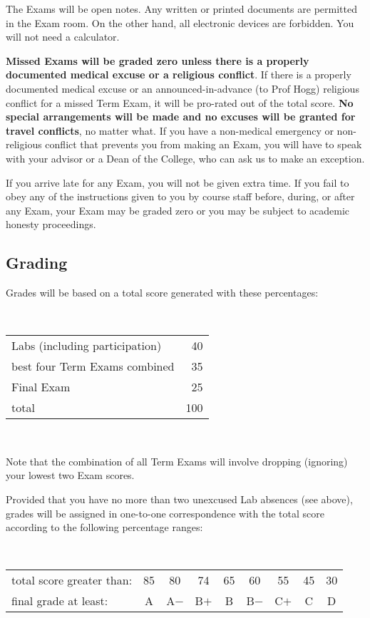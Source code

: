 \documentclass[12pt, letterpaper]{article}
\begin{document}
The Exams will be open notes.
Any written or printed documents are permitted in the Exam room.
On the other hand, all electronic devices are forbidden.
You will not need a calculator.

\textbf{Missed Exams will be graded zero unless there is a properly
  documented medical excuse or a religious conflict}. If there is a
properly documented medical excuse or an announced-in-advance (to Prof
Hogg) religious conflict for a missed Term Exam, it will be pro-rated
out of the total score. \textbf{No special arrangements will be made
  and no excuses will be granted for travel conflicts}, no matter
what. If you have a non-medical emergency or non-religious conflict
that prevents you from making an Exam, you will have to speak with your
advisor or a Dean of the College, who can ask us to make an exception.

If you arrive late for any Exam, you will not be given extra time. If
you fail to obey any of the instructions given to you by course staff
before, during, or after any Exam, your Exam may be graded zero or you
may be subject to academic honesty proceedings.

\subsection*{Grading}

Grades will be based on a total score generated with these percentages:

\bigskip\noindent
~\hfill\begin{tabular}{lr}
\hline
Labs (including participation) &  40 \\
best four Term Exams combined  &  35 \\
Final Exam                     &  25 \\
\hline
total                          & 100 \\
\hline
\end{tabular}\hfill ~

\bigskip\noindent
Note that the combination of all Term Exams will involve dropping
(ignoring) your lowest two Exam scores.

Provided that you have no more than two unexcused Lab absences (see
above), grades will be assigned in one-to-one correspondence with the
total score according to the following percentage ranges:

\bigskip\noindent
~\hfill\begin{tabular}{lcccccccc}
\hline
total score greater than: & 85 & 80   & 74   & 65 & 60   & 55   & 45 & 30 \\
final grade at least:     & A  & A$-$ & B$+$ & B  & B$-$ & C$+$ & C  & D  \\
\hline
\end{tabular}\hfill~
\end{document}
